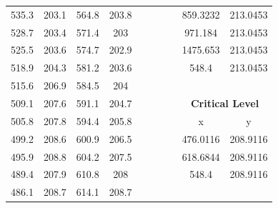 \begin{center}
\begin{tabular}{|cccc||cccc||cc|}
    535.3    & 203.1                    & 564.8 & 203.8                         &          &                         &       &                               & 859.3232 & 213.0453                            \\
    528.7    & 203.4                    & 571.4 & 203                           &          &                         &       &                               & 971.184  & 213.0453                            \\
    525.5    & 203.6                    & 574.7 & 202.9                         &          &                         &       &                               & 1475.653 & 213.0453                            \\
    518.9    & 204.3                    & 581.2 & 203.6                         &          &                         &       &                               & 548.4    & 213.0453                            \\
    515.6    & 206.9                    & 584.5 & 204                           &          &                         &       &                               &          &                                     \\
    509.1    & 207.6                    & 591.1 & 204.7                         &          &                         &       &                               & \multicolumn{2}{c|}{\textbf{Critical Level }}  \\ 
    \cline{9-10}
    505.8    & 207.8                    & 594.4 & 205.8                         &          &                         &       &                               & x        & y                                   \\
    499.2    & 208.6                    & 600.9 & 206.5                         &          &                         &       &                               & 476.0116 & 208.9116                            \\
    495.9    & 208.8                    & 604.2 & 207.5                         &          &                         &       &                               & 618.6844 & 208.9116                            \\
    489.4    & 207.9                    & 610.8 & 208                           &          &                         &       &                               & 548.4    & 208.9116                            \\
    486.1    & 208.7                    & 614.1 & 208.7                         &          &                         &       &                               &          &                                     \\

\end{tabular}
\end{center}
